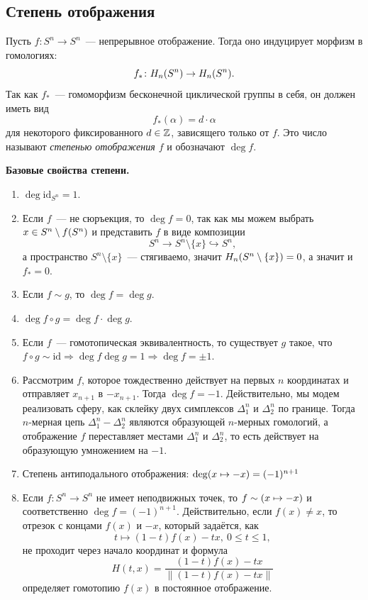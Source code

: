     \subsection{Степень отображения}

    \begin{definition}
        Пусть $f\colon S^n \to S^n$~--- непрерывное отображение. Тогда оно индуцирует морфизм в гомологиях:
        \[ f_{*}\colon H_{n}\lr*{S^n} \to H_{n}\lr*{S^n}. \]
        Так как $f_{*}$~--- гомоморфизм бесконечной циклической группы в себя, он должен иметь вид
        \[ f_{*}(\alpha) = d \cdot \alpha \]
        для некоторого фиксированного $d \in \Z$, зависящего только от $f$. Это число называют \emph{степенью отображения $f$}
        и обозначают $\deg{f}$.
    \end{definition}

    \noindent\bf{Базовые свойства степени.}

    \begin{enumerate}
        \item $\deg{\mathrm{id}_{S^n}} = 1$.
        \item Если $f$~--- не сюръекция, то $\deg{f} = 0$, так как мы можем выбрать $x \in S^n\setminus f\lr*{S^n}$  и
        представить $f$ в виде композиции
        \[ S^n \to S^n \setminus \{ x \} \hookrightarrow S^n, \]
        а пространство $S^n \setminus \{ x \}$~--- стягиваемо, значит $H_{n}\lr*{S^n \setminus \{ x \}} = 0$, а значит и $f_{*} = 0$.
        \item Если $f \sim g$, то $\deg{f} = \deg{g}$.
        \item $\deg{f \circ g} = \deg{f} \cdot \deg{g}$.
        \item Если $f$~--- гомотопическая эквивалентность,  то существует $g$ такое, что $f \circ g \sim \mathrm{id} \Rightarrow \deg{f} \deg{g} = 1 \Rightarrow \deg{f} = \pm 1$.
        \item Рассмотрим $f$, которое тождественно действует на первых $n$ координатах и отправляет $x_{n + 1}$ в $-x_{n + 1}$.
        Тогда $\deg{f} = -1$.  Действительно, мы модем реализовать сферу, как склейку двух симплексов $\Delta_{1}^n$ и $\Delta_{2}^n$ по границе.
        Тогда $n$-мерная цепь $\Delta_1^n - \Delta_2^n$ являются образующей $n$-мерных гомологий, а отображение $f$ переставляет местами
        $\Delta_1^n$ и $\Delta_2^n$, то есть действует на образующую умножением на $-1$.
        \item Степень антиподального отображения: $\deg\lr*{x \mapsto -x} = (-1)^{n + 1}$
        \item Если $f \colon S^n \to S^n$ не имеет неподвижных точек, то $f \sim \lr*{x \mapsto -x}$ и соответственно $\deg{f} = (-1)^{n + 1}$.  Действительно, если $f(x) \neq x$, то
        отрезок с концами $f(x)$ и $-x$, который задаётся, как
        \[ t \mapsto (1 - t)f(x) - tx, \ 0 \le t \le 1, \]
        не проходит через начало координат и формула
        \[ H(t, x) = \frac{(1 - t)f(x) - tx}{\| (1 - t)f(x) - tx \|} \]
        определяет гомотопию $f(x)$ в постоянное отображение.
    \end{enumerate}

